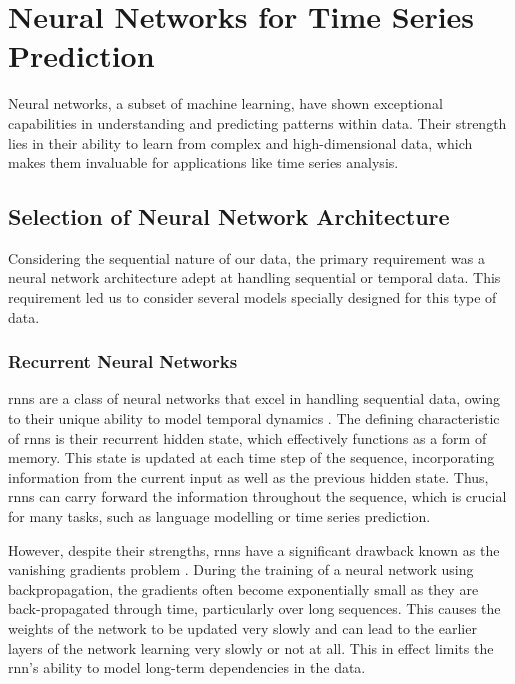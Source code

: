 \chapter{Neural Networks for Time Series Prediction}\label{chap:nn}

Neural networks, a subset of machine learning, have shown exceptional
capabilities in understanding and predicting patterns within data. Their
strength lies in their ability to learn from complex and high-dimensional data,
which makes them invaluable for applications like time series analysis.

\section{Selection of Neural Network Architecture}

Considering the sequential nature of our data, the primary requirement was a
neural network architecture adept at handling sequential or temporal data. This
requirement led us to consider several models specially designed for this type
of data.

\subsection{Recurrent Neural Networks}

\glspl{rnn} are a class of neural networks that excel in handling sequential data,
owing to their unique ability to model temporal dynamics \citep{doi:10.1073/pnas.79.8.2554}.
The defining characteristic of \glspl{rnn} is their recurrent hidden state,
which effectively functions as a form of memory. This state is updated at each
time step of the sequence, incorporating information from the current input as
well as the previous hidden state. Thus, \glspl{rnn} can carry forward the
information throughout the sequence, which is crucial for many tasks, such
as language modelling or time series prediction.

However, despite their strengths, \glspl{rnn} have a significant drawback known
as the vanishing gradients problem \citep{gradients:1994}. During the training
of a neural network using backpropagation, the gradients often become
exponentially small as they are back-propagated through time, particularly over
long sequences. This causes the weights of the network to be updated very
slowly and can lead to the earlier layers of the network learning very slowly
or not at all. This in effect limits the \gls{rnn}'s ability to model long-term
dependencies in the data.

